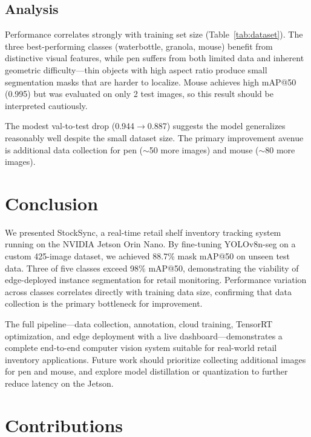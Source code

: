 \documentclass[10pt,twocolumn,letterpaper]{article}
\begin{document}
\subsection{Analysis}

Performance correlates strongly with training set size
(Table~\ref{tab:dataset}). The three best-performing
classes (waterbottle, granola, mouse) benefit from
distinctive visual features, while pen suffers from both
limited data and inherent geometric difficulty---thin
objects with high aspect ratio produce small segmentation
masks that are harder to localize. Mouse achieves high
mAP@50 (0.995) but was evaluated on only 2 test images,
so this result should be interpreted cautiously.

The modest val-to-test drop (0.944$\rightarrow$0.887)
suggests the model generalizes reasonably well despite the
small dataset size. The primary improvement avenue is
additional data collection for pen ($\sim$50 more images)
and mouse ($\sim$80 more images).

\section{Conclusion}

We presented StockSync, a real-time retail shelf inventory
tracking system running on the NVIDIA Jetson Orin Nano. By
fine-tuning YOLOv8n-seg on a custom 425-image dataset, we
achieved 88.7\% mask mAP@50 on unseen test data. Three of
five classes exceed 98\% mAP@50, demonstrating the
viability of edge-deployed instance segmentation for retail
monitoring. Performance variation across classes correlates
directly with training data size, confirming that data
collection is the primary bottleneck for improvement.

The full pipeline---data collection, annotation, cloud
training, TensorRT optimization, and edge deployment with a
live dashboard---demonstrates a complete end-to-end computer
vision system suitable for real-world retail inventory
applications. Future work should prioritize collecting
additional images for pen and mouse, and explore model
distillation or quantization to further reduce latency on
the Jetson.

\section*{Contributions}
\end{document}
